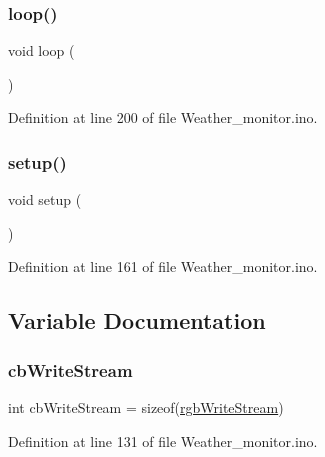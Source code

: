 \subsubsection{\texorpdfstring{loop()}{loop()}}
{\footnotesize\ttfamily void loop (\begin{DoxyParamCaption}{ }\end{DoxyParamCaption})}



Definition at line 200 of file Weather\+\_\+monitor.\+ino.

\mbox{\label{_weather__monitor_8ino_a4fc01d736fe50cf5b977f755b675f11d}} 
\subsubsection{\texorpdfstring{setup()}{setup()}}
{\footnotesize\ttfamily void setup (\begin{DoxyParamCaption}{ }\end{DoxyParamCaption})}



Definition at line 161 of file Weather\+\_\+monitor.\+ino.



\subsection{Variable Documentation}
\mbox{\label{_weather__monitor_8ino_acbdcae1943d12f8baa3ea151e6028b65}} 
\subsubsection{\texorpdfstring{cb\+Write\+Stream}{cbWriteStream}}
{\footnotesize\ttfamily int cb\+Write\+Stream = sizeof(\hyperlink{_weather__monitor_8ino_a0990cd80a9c34e96dafbc001af446b06}{rgb\+Write\+Stream})}



Definition at line 131 of file Weather\+\_\+monitor.\+ino.

\mbox{\label{_weather__monitor_8ino_aa69b2105b445fb74380087765ddab644}} 
